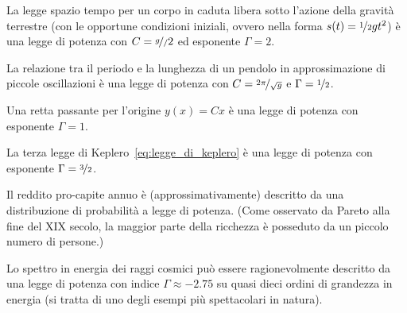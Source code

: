 \begin{examplebox}
  \begin{example}\label{exp:pl_moto_accelerato}
    La legge spazio tempo per un corpo in caduta libera sotto l'azione della gravità
    terrestre (con le opportune condizioni iniziali, ovvero nella forma
    $s(t) = \nicefrac{1}{2}gt^2$) è una legge di potenza con $C = \nicefrac{g}/{2}$
    ed esponente $\Gamma = 2$.
  \end{example}

  \begin{example}
    La relazione tra il periodo e la lunghezza di un pendolo in
    approssimazione di piccole oscillazioni è una legge di potenza con
    $C = \nicefrac{2\pi}{\sqrt{g}}$ e $\Gamma = \nicefrac{1}{2}$.
  \end{example}

  \begin{example}
    Una retta passante per l'origine $y(x) = Cx$ è una legge di potenza con
    esponente $\Gamma = 1$.
  \end{example}

  \begin{example}
    La terza legge di Keplero~\eqref{eq:legge_di_keplero} è una legge di
    potenza con esponente $\Gamma = \nicefrac{3}{2}$.
  \end{example}

  \begin{example}
    Il reddito pro-capite annuo è (approssimativamente) descritto da una
    distribuzione di probabilità a legge di potenza. (Come osservato da
    Pareto alla fine del XIX secolo, la maggior parte della ricchezza è
    posseduto da un piccolo numero di persone.)
  \end{example}

  \begin{example}\label{exp:pl_raggi_cosmici}
    Lo spettro in energia dei raggi cosmici può essere ragionevolmente
    descritto da una legge di potenza con indice $\Gamma \approx -2.75$ su quasi
    dieci ordini di grandezza in energia (si tratta di uno degli esempi più
    spettacolari in natura).
  \end{example}
\end{examplebox}

